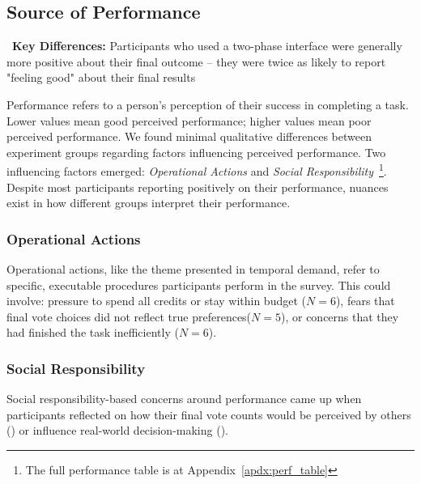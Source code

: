 

\subsection{Source of Performance}
\label{sec:performance}

\begin{tldrbox}
   \faKey~\textbf{Key Differences:} Participants who used a two-phase interface were generally more positive about their final outcome -- they were twice as likely to report "feeling good" about their final results
\end{tldrbox}

Performance refers to a person's perception of their success in completing a task. Lower values mean good perceived performance; higher values mean poor perceived performance. We found minimal qualitative differences between experiment groups regarding factors influencing perceived performance. Two influencing factors emerged: \textit{Operational Actions} and \textit{Social Responsibility}~\footnote{The full performance table is at Appendix~\ref{apdx:perf_table}}. Despite most participants reporting positively on their performance, nuances exist in how different groups interpret their performance.

\subsubsection{Operational Actions}
Operational actions, like the theme presented in temporal demand, refer to specific, executable procedures participants perform in the survey. This could involve: pressure to spend all credits or stay within budget ($N=6$), fears that final vote choices did not reflect true preferences($N=5$), or concerns that they had finished the task inefficiently ($N=6$).

\subsubsection{Social Responsibility}
Social responsibility-based concerns around performance came up when participants reflected on how their final vote counts would be perceived by others () or influence real-world decision-making ().

